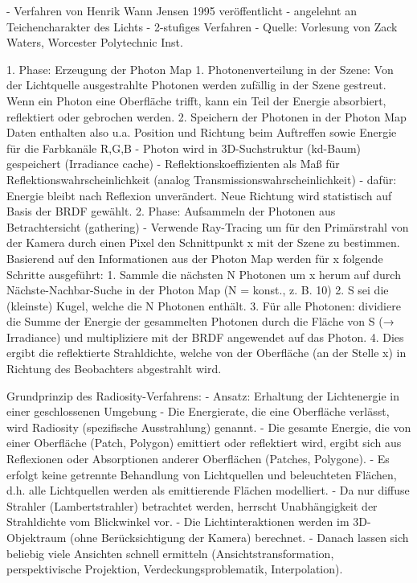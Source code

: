 \documentclass[10pt,landscape]{article}
\makeatletter
\renewcommand{\subsection}{\@startsection{subsection}{2}{0mm}%
                                {-1explus -.5ex minus -.2ex}%
                                {0.5ex plus .2ex}%
                                {\normalfont\normalsize\bfseries}}
\makeatother
\begin{document}
\begin{multicols}{3}
- Verfahren von Henrik Wann Jensen 1995 veröffentlicht
- angelehnt an Teichencharakter des Lichts
- 2-stufiges Verfahren
- Quelle: Vorlesung von Zack Waters, Worcester Polytechnic Inst.


1. Phase: Erzeugung der Photon Map
     1. Photonenverteilung in der Szene: Von der Lichtquelle ausgestrahlte Photonen werden zufällig in der Szene gestreut. Wenn ein Photon eine Oberfläche trifft, kann ein Teil der Energie absorbiert, reflektiert oder gebrochen werden.
     2. Speichern der Photonen in der Photon Map Daten enthalten also u.a. Position und Richtung beim Auftreffen sowie Energie für die Farbkanäle R,G,B
        - Photon wird in 3D-Suchstruktur (kd-Baum) gespeichert (Irradiance cache) 
        - Reflektionskoeffizienten als Maß für Reflektionswahrscheinlichkeit (analog Transmissionswahrscheinlichkeit) 
        - dafür: Energie bleibt nach Reflexion unverändert. Neue Richtung wird statistisch auf Basis der BRDF gewählt.
2. Phase: Aufsammeln der Photonen aus Betrachtersicht (gathering)
   - Verwende Ray-Tracing um für den Primärstrahl von der Kamera durch einen Pixel den Schnittpunkt x mit der Szene zu bestimmen. Basierend auf den Informationen aus der Photon Map werden für x folgende Schritte ausgeführt:
       1. Sammle die nächsten N Photonen um x herum auf durch Nächste-Nachbar-Suche in der Photon Map (N = konst., z. B. 10)
       2. S sei die (kleinste) Kugel, welche die N Photonen enthält.
       3. Für alle Photonen: dividiere die Summe der Energie der gesammelten Photonen durch die Fläche von S (→ Irradiance) und multipliziere mit der  BRDF angewendet auf das Photon.
       4. Dies ergibt die reflektierte Strahldichte, welche von der Oberfläche (an der Stelle x) in Richtung des Beobachters abgestrahlt wird.

Grundprinzip des Radiosity-Verfahrens:
- Ansatz: Erhaltung der Lichtenergie in einer geschlossenen Umgebung
- Die Energierate, die eine Oberfläche verlässt, wird Radiosity (spezifische Ausstrahlung) genannt.
- Die gesamte Energie, die von einer Oberfläche (Patch, Polygon) emittiert oder reflektiert wird, ergibt sich aus Reflexionen oder Absorptionen anderer Oberflächen (Patches, Polygone).
- Es erfolgt keine getrennte Behandlung von Lichtquellen und beleuchteten Flächen, d.h. alle Lichtquellen werden als emittierende Flächen modelliert.
- Da nur diffuse Strahler (Lambertstrahler) betrachtet werden, herrscht Unabhängigkeit der Strahldichte vom Blickwinkel vor.
- Die Lichtinteraktionen werden im 3D-Objektraum (ohne Berücksichtigung der Kamera) berechnet.
- Danach lassen sich beliebig viele Ansichten schnell ermitteln (Ansichtstransformation, perspektivische Projektion, Verdeckungsproblematik, Interpolation).


\end{multicols}
\end{document}
